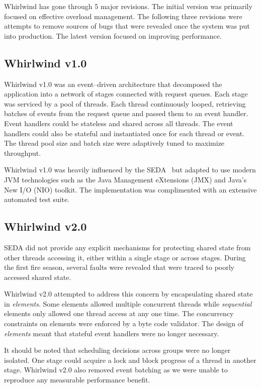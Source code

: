 \documentclass[conference]{IEEEtran}
\begin{document}
Whirlwind has gone through 5 major revisions. The initial version was primarily focused on effective overload management. The following three revisions were attempts to remove sources of bugs that were revealed once the system was put into production. The latest version focused on improving performance.

\subsection{Whirlwind v1.0}

Whirlwind v1.0 was an event--driven architecture that decomposed the application into a network of stages connected with request queues. Each stage was serviced by a pool of threads. Each thread continuously looped, retrieving batches of events from the request queue and passed them to an event handler. Event handlers could be stateless and shared across all threads. The event handlers could also be stateful and instantiated once for each thread or event. The thread pool size and batch size were adaptively tuned to maximize throughput. 

Whirlwind v1.0 was heavily influenced by the SEDA~\cite{welsh03Adaptive} but adapted to use modern JVM technologies such as the Java Management eXtensions (JMX) and Java's New I/O (NIO) toolkit. The implementation was complimented with an extensive automated test suite. 

\subsection{Whirlwind v2.0}

SEDA did not provide any explicit mechanisms for protecting shared state from other threads accessing it, either within a single stage or across stages. During the first fire season, several faults were revealed that were traced to poorly accessed shared state.

Whirlwind v2.0 attempted to address this concern by encapsulating shared state in \emph{elements}. Some elements allowed multiple concurrent threads while \emph{sequential} elements only allowed one thread access at any one time. The concurrency constraints on elements were enforced by a byte code validator. The design of \emph{elements} meant that stateful event handlers were no longer necessary.

It should be noted that scheduling decisions across groups were no longer isolated. One stage could acquire a lock and block progress of a thread in another stage. Whirlwind v2.0 also removed event batching as we were unable to reproduce any measurable performance benefit.
\end{document}
